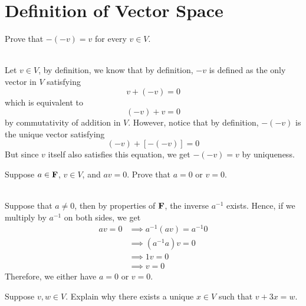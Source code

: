 \section{Definition of Vector Space}

\begin{exercise}
    Prove that $-(-v) = v$ for every $v \in V$.\\
\end{exercise}

\begin{solution}
    \\ Let $v \in V$, by definition, we know that by definition, $-v$ is defined as the only vector in $V$ satisfying
    $$v + (-v) = 0$$
    which is equivalent to
    $$(-v) + v = 0$$ 
    by commutativity of addition in $V$. However, notice that by definition, $-(-v)$ is the unique vector satisfying
    $$(-v) + [-(-v)] = 0$$
    But since $v$ itself also satisfies this equation, we get $-(-v) = v$ by uniqueness.\\
\end{solution}

\begin{exercise}
    Suppose $a \in \mathbf{F}$, $v \in V$, and $av = 0$. Prove that $a = 0$ or $v = 0$.\\
\end{exercise}

\begin{solution}
    \\ Suppose that $a \neq 0$, then by properties of $\mathbf{F}$, the inverse $a^{-1}$ exists. Hence, if we multiply by $a^{-1}$ on both sides, we get
    \begin{align*}
        av = 0 &\implies a^{-1}(av) = a^{-1}0 \\
        &\implies (a^{-1}a)v = 0 \\
        &\implies 1v = 0 \\
        &\implies v = 0
    \end{align*}
    Therefore, we either have $a = 0$ or $v = 0$.\\
\end{solution}

\begin{exercise}
    Suppose $v, w \in V$. Explain why there exists a unique $x \in V$ such that $v + 3x = w$.\\
\end{exercise}


